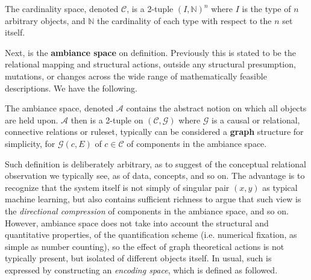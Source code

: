 \begin{definition}
  The cardinality space, denoted $\mathcal{C}$, is a 2-tuple $(I,\mathbb{N})^{n}$ where $I$ is the type of $n$ arbitrary objects, and $\mathbb{N}$ the cardinality of each type with respect to the $n$ set itself. 
\end{definition}
Next, is the \textbf{ambiance space} on definition. Previously this is stated to be the relational mapping and structural actions, outside any structural presumption, mutations, or changes across the wide range of mathematically feasible descriptions. We have the following. 
\begin{definition}
  The ambiance space, denoted $\mathcal{A}$ contains the abstract notion on which all objects are held upon. $\mathcal{A}$ then is a 2-tuple on $(\mathcal{C},\mathcal{G})$ where $\mathcal{G}$ is a causal or relational, connective relations or ruleset, typically can be considered a \textbf{graph} structure for simplicity, for $\mathcal{G}(c,E)$ of $c\in\mathcal{C}$ of components in the ambiance space. 
\end{definition}
Such definition is deliberately arbitrary, as to suggest of the conceptual relational observation we typically see, as of data, concepts, and so on. The advantage is to recognize that the system itself is not simply of singular pair $(x,y)$ as typical machine learning, but also contains sufficient richness to argue that such view is the \textit{directional compression} of components in the ambiance space, and so on. However, ambiance space does not take into account the structural and quantitative properties, of the quantification scheme (i.e. numerical fixation, as simple as number counting), so the effect of graph theoretical actions is not typically present, but isolated of different objects itself. In usual, such is expressed by constructing an \textit{encoding space}, which is defined as followed.  

